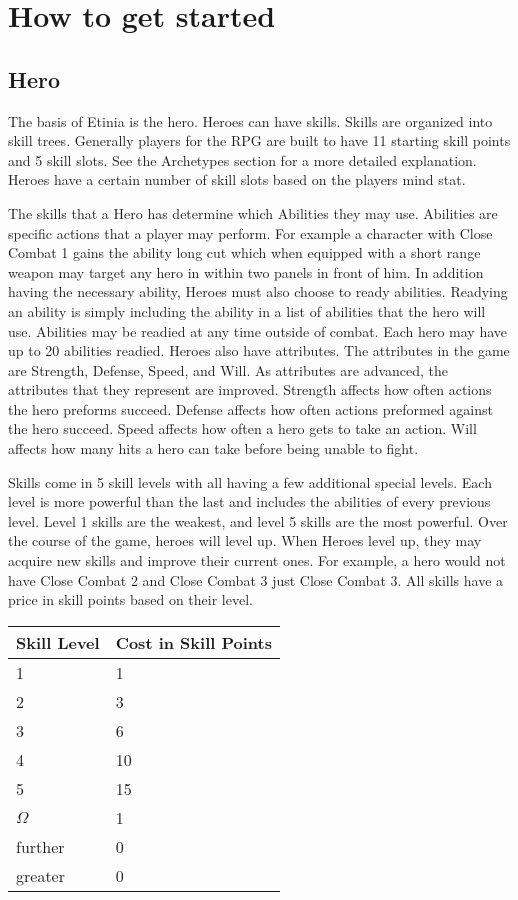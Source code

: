 \section{How to get started}

\subsection{Hero}

The basis of Etinia is the hero. Heroes can have skills.
Skills are organized into skill trees. Generally players for the RPG are
built to have 11 starting skill points and 5 skill slots. See the
Archetypes section for a more detailed explanation. Heroes have a certain
number of skill slots based on the players mind stat.

The skills that a Hero has determine which
Abilities they may use. Abilities
are specific actions that a player may perform. For example a character with
Close Combat 1 gains the ability long cut which when equipped with a short range
weapon may target any hero in within two panels in front of him. In addition
having the necessary ability, Heroes must also choose to ready abilities. Readying
an ability is simply including the ability in a list of abilities that the hero will
use. Abilities may be readied at any time outside of combat. Each hero may
have up to 20 abilities readied. 
Heroes also have attributes. The attributes in the game are Strength, Defense,
Speed, and Will. As attributes are advanced, the attributes that they represent
are improved. Strength affects how often actions the hero preforms succeed.
Defense affects how often actions preformed against the hero succeed. Speed
affects how often a hero gets to take an action. Will affects how many hits a
hero can take before being unable to fight.

Skills come in 5 skill levels with all having a
few additional special levels. Each level is more powerful than the last and
includes the abilities of every previous level. Level 1 skills are the weakest,
and level 5 skills are the most powerful. Over the course of the game, heroes
will level up. When Heroes level up, they may acquire new skills and improve
their current ones. For example, a hero would not have Close Combat 2 and Close
Combat 3 just Close Combat 3. All skills have a price in skill points based on
their level. 

\begin{center}
\begin{tabularx}{\textwidth}{X X}
\hline
Skill Level & Cost in Skill Points \\ \hline
1 & 1 \\
2 & 3 \\
3 & 6 \\
4 & 10 \\
5 & 15 \\
$\Omega$ & 1 \\
further & 0 \\
greater & 0 \\
\hline
\end{tabularx}
\end{center}

